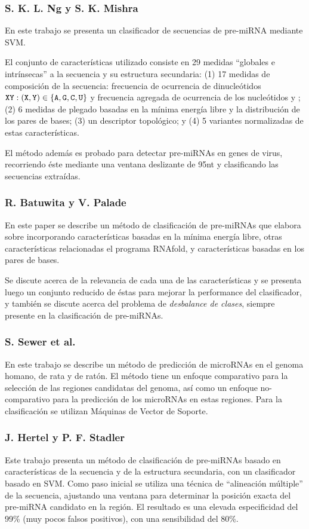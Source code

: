 \documentclass[12pt,bibliography=oldstyle,DIV=12,parskip=half-,titlepage]{scrartcl}
\begin{document}
\subsubsection*{S. K. L. Ng y S. K. Mishra \cite{ng}}
%
En este trabajo se presenta un clasificador de secuencias de
pre-miRNA mediante SVM.

El conjunto de características utilizado consiste en 29 medidas
``globales e intrínsecas'' a la secuencia y su estructura secundaria:
(1) 17 medidas de composición de la secuencia: frecuencia de
ocurrencia de dinucleótidos
${\tt XY}:({\tt X},{\tt Y})\in\{{\tt A},{\tt G},{\tt C},{\tt U}\}$
y frecuencia agregada de ocurrencia de los nucleótidos  y
; (2) 6 medidas de plegado basadas en la mínima energía libre
y la distribución de los pares de bases; (3) un descriptor
topológico; y (4) 5 variantes normalizadas de estas características.

El método además es probado para detectar pre-miRNAs en genes de
virus, recorriendo éste mediante una ventana deslizante de 95nt y
clasificando las secuencias extraídas.
%
\subsubsection*{R. Batuwita y V. Palade \cite{batuwita}}
En este paper se describe un método de clasificación de pre-miRNAs que
elabora sobre \cite{ng} incorporando características basadas en la
mínima energía libre, otras características relacionadas el programa
RNAfold, y características basadas en los pares de bases.

Se discute acerca de la relevancia de cada una de las características
y se presenta luego un conjunto reducido de éstas para mejorar la
performance del clasificador, y también se discute acerca del problema
de \emph{desbalance de clases}, siempre presente en la
clasificación de pre-miRNAs.
%
\subsubsection*{S. Sewer et al. \cite{sewer}}
En este trabajo se describe un método de predicción de microRNAs en el
genoma homano, de rata y de ratón. El método tiene un enfoque
comparativo para la selección de las regiones candidatas del genoma,
así como un enfoque no-comparativo para la predicción de los microRNAs
en estas regiones. Para la clasificación se utilizan Máquinas de
Vector de Soporte.
%
\subsubsection*{J. Hertel y P. F. Stadler \cite{hertel}}
Este trabajo presenta un método de clasificación de pre-miRNAs basado
en características de la secuencia y de la estructura secundaria, con
un clasificador basado en SVM. Como paso inicial se utiliza una
técnica de ``alineación múltiple'' de la secuencia, ajustando una
ventana para determinar la posición exacta del pre-miRNA candidato en
la región.  El resultado es una elevada especificidad del 99\% (muy
pocos falsos positivos), con una sensibilidad del 80\%.
%
\end{document}
